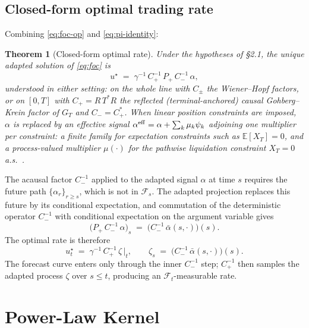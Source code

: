 \documentclass[11pt]{article}
\newcommand{\E}{\mathbb{E}}
\newcommand{\F}{\mathcal{F}}
\newcommand{\eff}{{\rm eff}}
\theoremstyle{plain}
\newtheorem{theorem}{Theorem}
\begin{document}
\subsection{Closed-form optimal trading rate}

Combining \eqref{eq:foc-op} and \eqref{eq:pi-identity}:

\begin{theorem}[Closed-form optimal rate]
Under the hypotheses of \S2.1, the unique adapted solution of \eqref{eq:foc} is
\begin{equation}\label{eq:closedform}
u^\star \;=\; \gamma^{-1}\, C_+^{-1}\, P_+\, C_-^{-1}\, \alpha,
\end{equation}
understood in either setting: on the whole line with $C_\pm$ the Wiener--Hopf factors, or on $[0,T]$ with $C_+ = R\,T^*R$ the reflected (terminal-anchored) causal Gohberg--Krein factor of $G_T$ and $C_- = C_+^*$. When linear position constraints are imposed, $\alpha$ is replaced by an effective signal $\alpha^{\eff} = \alpha + \sum_k\mu_k\psi_k$ adjoining one multiplier per constraint: a finite family for expectation constraints such as $\E[X_T]=0$, and a process-valued multiplier $\mu(\cdot)$ for the pathwise liquidation constraint $X_T=0$ a.s.\ \citep{FordeSanchezSmith2022}.
\end{theorem}

The acausal factor $C_-^{-1}$ applied to the adapted signal $\alpha$ at time $s$ requires the future path $\{\alpha_r\}_{r\ge s}$, which is not in $\F_s$. The adapted projection replaces this future by its conditional expectation, and commutation of the deterministic operator $C_-^{-1}$ with conditional expectation on the argument variable \citep[Prop.~2.6.13]{HytonenVanNeervenVeraarWeis2016} gives
\begin{equation}\label{eq:proj-cma}
\bigl(P_+\, C_-^{-1}\,\alpha\bigr)_s \;=\; \bigl(C_-^{-1}\,\bar\alpha(s,\cdot)\bigr)(s).
\end{equation}
The optimal rate is therefore
\begin{equation}\label{eq:closedform-forecast}
u^\star_t \;=\; \gamma^{-1}\,C_+^{-1}\,\zeta\,\bigl|_{t}, \qquad \zeta_s \;=\; \bigl(C_-^{-1}\,\bar\alpha(s,\cdot)\bigr)(s).
\end{equation}
The forecast curve enters only through the inner $C_-^{-1}$ step; $C_+^{-1}$ then samples the adapted process $\zeta$ over $s\le t$, producing an $\F_t$-measurable rate.

\section{Power-Law Kernel}
\end{document}
